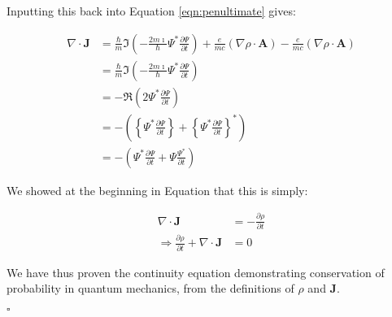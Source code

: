 \documentclass{article}
\begin{document}
Inputting this back into Equation \ref{eqn:penultimate} gives:

\begin{align}
    \nabla \cdot \mathbf{J} &= \frac{\hbar}{m} \Im
    \left(-\frac{2m\imath}{\hbar}\Psi^* \frac{\partial \Psi}{\partial t}\right)
     + \frac{e}{mc}(\nabla \rho \cdot \mathbf{A}) - \frac{e}{mc}(\nabla \rho
    \cdot \mathbf{A}) \\
    &= \frac{\hbar}{m} \Im \left(-\frac{2m\imath}{\hbar}\Psi^* \frac{\partial
    \Psi}{\partial t}\right) \\
    &= - \Re \left( 2 \Psi^* \frac{\partial \Psi}{\partial t} \right) \\
    &= - \left( \left\{ \Psi^* \frac{\partial \Psi}{\partial t} \right\} +
    \left\{ \Psi^* \frac{\partial \Psi}{\partial t} \right\}^* \right) \\
    &= - \left( \Psi^* \frac{ \partial \Psi }{ \partial t } + \Psi \frac{
    \Psi^*}{\partial t} \right)
\end{align}

We showed at the beginning in Equation \label{eqn:density-change} that this is
simply:

\begin{align}
    \nabla \cdot \mathbf{J} &= - \frac{\partial \rho}{\partial t} \\
    \Rightarrow \frac{\partial \rho}{\partial t} + \nabla \cdot \mathbf{J}
    &= 0
\end{align}

We have thus proven the continuity equation demonstrating conservation of
probability in quantum mechanics, from the definitions of $\rho$ and
$\mathbf{J}$.

$\square$
\end{document}

